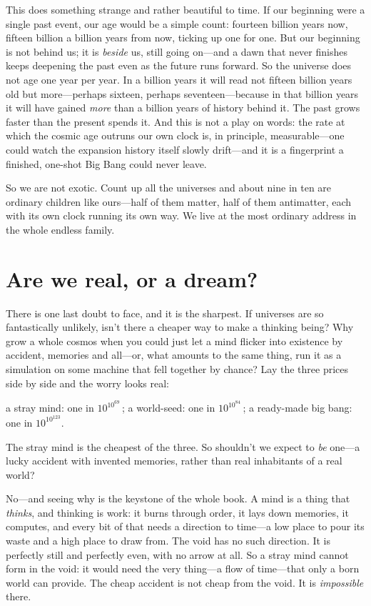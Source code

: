 This does something strange and rather beautiful to time. If our beginning were a single
past event, our age would be a simple count: fourteen billion years now, fifteen billion
a billion years from now, ticking up one for one. But our beginning is not behind us; it
is \emph{beside} us, still going on---and a dawn that never finishes keeps deepening the
past even as the future runs forward. So the universe does not age one year per year. In a
billion years it will read not fifteen billion years old but more---perhaps sixteen,
perhaps seventeen---because in that billion years it will have gained \emph{more} than a
billion years of history behind it. The past grows faster than the present spends it. And
this is not a play on words: the rate at which the cosmic age outruns our own clock is, in
principle, measurable---one could watch the expansion history itself slowly drift---and it
is a fingerprint a finished, one-shot Big Bang could never leave.

So we are not exotic. Count up all the universes and about nine in ten are
ordinary children like ours---half of them matter, half of them antimatter, each
with its own clock running its own way. We live at the most ordinary address in
the whole endless family.

\section*{Are we real, or a dream?}

There is one last doubt to face, and it is the sharpest. If universes are so
fantastically unlikely, isn't there a cheaper way to make a thinking being? Why
grow a whole cosmos when you could just let a mind flicker into existence by
accident, memories and all---or, what amounts to the same thing, run it as a
simulation on some machine that fell together by chance? Lay the three prices side
by side and the worry looks real:

\begin{center}
a stray mind: one in $10^{10^{69}}$\,;\qquad
a world-seed: one in $10^{10^{84}}$\,;\qquad
a ready-made big bang: one in $10^{10^{123}}$.
\end{center}

\noindent The stray mind is the cheapest of the three. So shouldn't we expect to
\emph{be} one---a lucky accident with invented memories, rather than real
inhabitants of a real world?

No---and seeing why is the keystone of the whole book. A mind is a thing that
\emph{thinks}, and thinking is work: it burns through order, it lays down
memories, it computes, and every bit of that needs a direction to time---a low
place to pour its waste and a high place to draw from. The void has no such
direction. It is perfectly still and perfectly even, with no arrow at all. So a
stray mind cannot form in the void: it would need the very thing---a flow of
time---that only a born world can provide. The cheap accident is not cheap from
the void. It is \emph{impossible} there.

